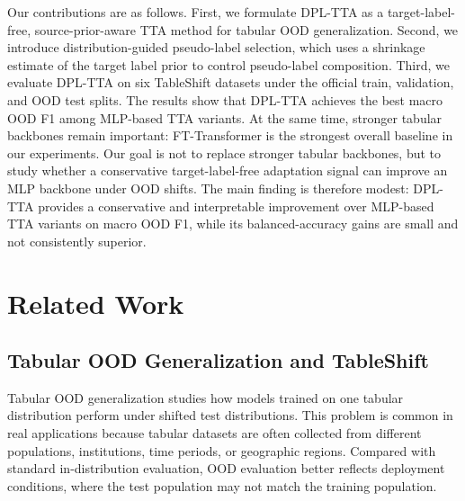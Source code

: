 \documentclass{article}
\begin{document}
Our contributions are as follows. First, we formulate DPL-TTA as a target-label-free, source-prior-aware TTA method for tabular OOD generalization. Second, we introduce distribution-guided pseudo-label selection, which uses a shrinkage estimate of the target label prior to control pseudo-label composition. Third, we evaluate DPL-TTA on six TableShift datasets under the official train, validation, and OOD test splits. The results show that DPL-TTA achieves the best macro OOD F1 among MLP-based TTA variants. At the same time, stronger tabular backbones remain important: FT-Transformer is the strongest overall baseline in our experiments. Our goal is not to replace stronger tabular backbones, but to study whether a conservative target-label-free adaptation signal can improve an MLP backbone under OOD shifts. The main finding is therefore modest: DPL-TTA provides a conservative and interpretable improvement over MLP-based TTA variants on macro OOD F1, while its balanced-accuracy gains are small and not consistently superior.

%

\section{Related Work}

\subsection{Tabular OOD Generalization and TableShift}

Tabular OOD generalization studies how models trained on one tabular distribution perform under shifted test distributions. This problem is common in real applications because tabular datasets are often collected from different populations, institutions, time periods, or geographic regions. Compared with standard in-distribution evaluation, OOD evaluation better reflects deployment conditions, where the test population may not match the training population.
\end{document}
